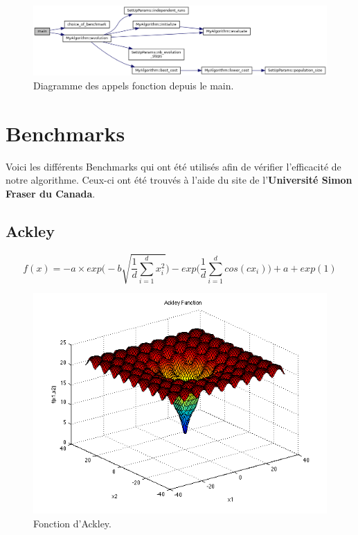\documentclass[a4paper, fontsize=11pt]{article}
\begin{document}
\begin{figure}[h]
\centering
\includegraphics[width=1\textwidth]{callgraph.png}
\caption{\label{fig:frog}Diagramme des appels fonction depuis le main.}
\end{figure}

\clearpage

\newpage

\section{Benchmarks}
Voici les différents Benchmarks qui ont été utilisés afin de vérifier l'efficacité de notre algorithme.
Ceux-ci ont été trouvés à l'aide du site de l'\textbf{Université Simon Fraser du Canada}\cite{sfuca}.

\subsection{Ackley}
\begin{equation}
f(x) = -a \times exp\Bigg(-b \sqrt{\frac{1}{d}\sum_{i=1}^{d} x_i^2}\Bigg) - exp\Bigg(\frac{1}{d}\sum_{i=1}^{d} cos(cx_i)\Bigg) + a + exp(1)
\end{equation}

\begin{figure}[b]
\centering
\includegraphics[width=1\textwidth]{ackley.png}
\caption{\label{fig:frog}Fonction d'Ackley.}
\end{figure}
\end{document}
